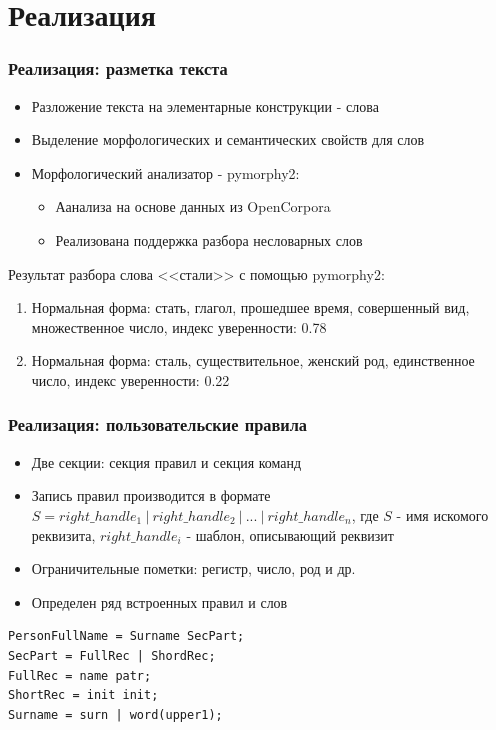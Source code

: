 \documentclass{beamer}
\begin{document}
\section{Реализация}
\begin{frame}[fragile]
\frametitle{Реализация: разметка текста}
\begin{itemize}
	\item Разложение текста на элементарные конструкции - слова
	\item Выделение морфологических и семантических свойств для слов
	\item Морфологический анализатор - pymorphy2:
	\begin{itemize}
		\item Аанализа на основе данных из OpenCorpora
		\item Реализована поддержка разбора несловарных слов
	\end{itemize}
\end{itemize}
\begin{example}
Результат разбора слова <<стали>> с помощью pymorphy2:
\begin{enumerate}
	\item Нормальная форма: стать, глагол, прошедшее время, совершенный вид, множественное число, индекс уверенности: 0.78
	\item Нормальная форма: сталь, существительное, женский род, единственное число, индекс уверенности: 0.22
\end{enumerate}
\end{example}
\end{frame}

\begin{frame}[fragile]
\frametitle{Реализация: пользовательские правила}
\begin{itemize}
	\item Две секции: секция правил и секция команд
	\item Запись правил производится в формате $S = right\_handle_1\ |\ right\_handle_2\ |\ ...\ |\ right\_handle_n$, где $S$ - имя искомого реквизита, $right\_handle_i$ - шаблон, описывающий реквизит
	\item Ограничительные пометки: регистр, число, род и др.
	\item Определен ряд встроенных правил и слов
\end{itemize}
\begin{example}
\begin{verbatim}
PersonFullName = Surname SecPart;
SecPart = FullRec | ShordRec;
FullRec = name patr;
ShortRec = init init;
Surname = surn | word(upper1);
\end{verbatim}
\end{example}
\end{frame}
\end{document}
